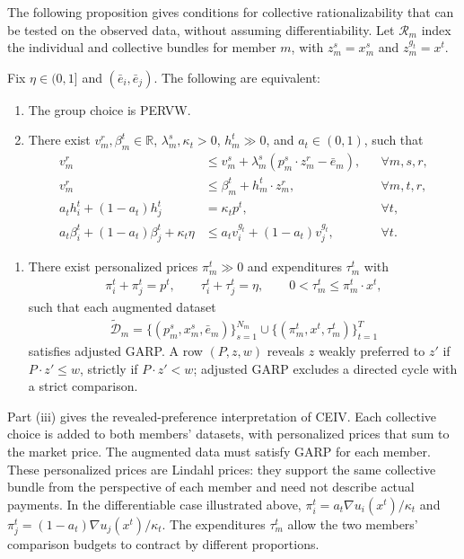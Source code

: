 \documentclass[11 pt]{article}
\begin{document}
The following proposition gives conditions for collective rationalizability that can be tested on the observed data, without assuming differentiability. Let $\mathcal R_m$ index the individual and collective bundles for member $m$, with $z_m^s=x_m^s$ and $z_m^{g_t}=x^t$.

\begin{proposition}\label{prop:collv2_afriat}
Fix $\eta\in(0,1]$ and $(\bar e_i,\bar e_j)$. The following are equivalent:
\begin{enumerate}
\item[(i)] The group choice is PERVW.
\item[(ii)] There exist $v_m^r,\beta_m^t\in\mathbb R$, $\lambda_m^s,\kappa_t>0$, $h_m^t\gg0$, and $a_t\in(0,1)$, such that
\begin{align}
v_m^r&\leq v_m^s+\lambda_m^s(p_m^s\cdot z_m^r-\bar e_m),&&\forall m,s,r,\label{eqn:collv2_I}\\
v_m^r&\leq\beta_m^t+h_m^t\cdot z_m^r,&&\forall m,t,r,\label{eqn:collv2_S}\\
a_th_i^t+(1-a_t)h_j^t&=\kappa_t p^t,&&\forall t,\label{eqn:collv2_P}\\
a_t\beta_i^t+(1-a_t)\beta_j^t+\kappa_t\eta
&\leq a_tv_i^{g_t}+(1-a_t)v_j^{g_t},&&\forall t.\label{eqn:collv2_B}
\end{align}
\end{enumerate}
\begin{enumerate}
\item[(iii)] There exist personalized prices $\pi_m^t\gg0$ and expenditures $\tau_m^t$ with
\begin{align*}
\pi_i^t+\pi_j^t=p^t,\qquad
\tau_i^t+\tau_j^t=\eta,\qquad
0<\tau_m^t\leq\pi_m^t\cdot x^t,
\end{align*}
such that each augmented dataset
\begin{align*}
\widetilde{\mathcal D}_m
=\{(p_m^s,x_m^s,\bar e_m)\}_{s=1}^{N_m}
\cup\{(\pi_m^t,x^t,\tau_m^t)\}_{t=1}^{T}
\end{align*}
satisfies adjusted GARP. A row $(P,z,w)$ reveals $z$ weakly preferred to $z'$ if $P\cdot z'\leq w$, strictly if $P\cdot z'<w$; adjusted GARP excludes a directed cycle with a strict comparison.
\end{enumerate}
\end{proposition}

Part (iii) gives the revealed-preference interpretation of CEIV. Each collective choice is added to both members' datasets, with personalized prices that sum to the market price. The augmented data must satisfy GARP for each member. These personalized prices are Lindahl prices: they support the same collective bundle from the perspective of each member and need not describe actual payments. In the differentiable case illustrated above, $\pi_i^t=a_t\nabla u_i(x^t)/\kappa_t$ and $\pi_j^t=(1-a_t)\nabla u_j(x^t)/\kappa_t$. The expenditures $\tau_m^t$ allow the two members' comparison budgets to contract by different proportions.
\end{document}
